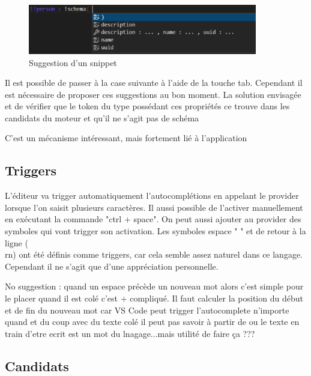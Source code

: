 \documentclass[
    iict, %
    il, %
]{heig-tb}
\begin{document}
\begin{figure}[!h]
    \begin{center}
        \includegraphics[width=10cm]{assets/figures/snippet-suggestion.png}
    \end{center}
    \caption[Suggestion d'un snippet]{\label{snippet-suggestion} Suggestion d'un snippet}
\end{figure}


Il est possible de passer à la case suivante à l'aide de la touche tab. %
Cependant il est nécessaire de proposer ces suggestions au bon moment. La solution envisagée et de vérifier que le token du type possédant
ces propriétés ce trouve dans les candidats du moteur et qu'il ne s'agit pas de schéma %

C'est un mécanisme intéressant, mais fortement lié à l'application


\subsection{Triggers}
L'éditeur va trigger automatiquement l'autocomplétions en appelant le provider lorsque l'on saisit plusieurs caractères. Il aussi possible de l'activer manuellement en exécutant la commande "ctrl + space".
On peut aussi ajouter au provider des symboles qui vont trigger son activation. Les symboles espace " " et de retour à la ligne (\\rn) ont été définis comme triggers, car cela semble assez naturel dans ce langage.
Cependant il ne s'agit que d'une appréciation personnelle.

No suggestion :
quand un espace précède un nouveau mot alors c'est simple pour le placer
quand il est colé c'est + compliqué. Il faut calculer la position du début et de fin du nouveau mot car VS Code peut trigger l'autocomplete n'importe quand et du coup
avec du texte colé il peut pas savoir à partir de ou le texte en train d'etre ecrit est un mot du lnagage...mais utilité de faire ça ???


\subsection{Candidats}\label{candidates}
\end{document}
